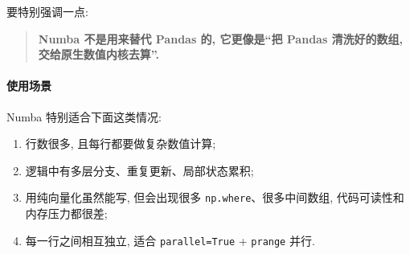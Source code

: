 \documentclass[11pt]{article}
\makeatletter
\providecommand{\tightlist}{%
      \setlength{\itemsep}{0pt}\setlength{\parskip}{0pt}}
\newcommand{\boxspacing}{\kern\kvtcb@left@rule\kern\kvtcb@boxsep}
\newcommand{\prompt}[4]{
        {\ttfamily\llap{{\color{#2}[#3]:\hspace{3pt}#4}}\vspace{-\baselineskip}}
    }
\makeatother
\begin{document}
要特别强调一点:

\begin{quote}
\textbf{Numba 不是用来替代 Pandas 的, 它更像是``把 Pandas 清洗好的数组,
交给原生数值内核去算''.}
\end{quote}

    \paragraph{使用场景}\label{ux4f7fux7528ux573aux666f}

    Numba 特别适合下面这类情况:

\begin{enumerate}
\def\labelenumi{\arabic{enumi}.}
\tightlist
\item
  行数很多, 且每行都要做复杂数值计算;
\item
  逻辑中有多层分支、重复更新、局部状态累积;
\item
  用纯向量化虽然能写, 但会出现很多 \texttt{np.where}、很多中间数组,
  代码可读性和内存压力都很差;
\item
  每一行之间相互独立, 适合 \texttt{parallel=True} + \texttt{prange}
  并行.
\end{enumerate}

    \begin{tcolorbox}[breakable, size=fbox, boxrule=1pt, pad at break*=1mm,colback=cellbackground, colframe=cellborder]
\prompt{In}{incolor}{ }{\boxspacing}
\begin{Verbatim}[commandchars=\\\{\}]

\end{Verbatim}
\end{tcolorbox}


    
    
    
\end{document}
